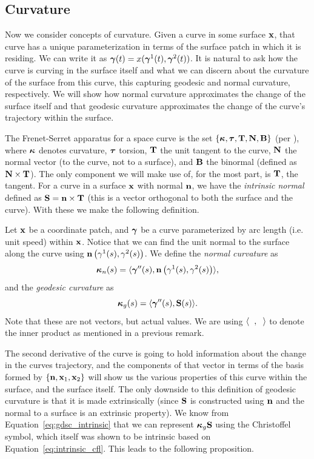 \subsection{Curvature}
  Now we consider concepts of curvature. Given a curve in some surface $\mathbf{x}$, that curve has a unique parameterization in terms of the surface patch in which it is residing. We can write it as $\boldsymbol{\gamma}(t) = x(\boldsymbol{\gamma}^1(t), \boldsymbol{\gamma}^2(t))$. It is natural to ask how the curve is curving in the surface itself and what we can discern about the curvature of the surface from this curve, this capturing geodesic and normal curvature, respectively. We will show how normal curvature approximates the change of the surface itself and that geodesic curvature approximates the change of the curve's trajectory within the surface.

  The Frenet-Serret apparatus for a space curve is the set $\{\boldsymbol{\kappa}, \boldsymbol{\tau}, \mathbf{T}, \mathbf{N}, \mathbf{B}\}$ (per \cite{MP77}), where $\boldsymbol{\kappa}$ denotes curvature, $\boldsymbol{\tau}$ torsion, $\mathbf{T}$ the unit tangent to the curve, $\mathbf{N}$ the normal vector (to the curve, not to a surface), and $\mathbf{B}$ the binormal (defined as $\mathbf{N} \times \mathbf{T}$). The only component we will make use of, for the most part, is $\mathbf{T}$, the tangent. For a curve in a surface $\mathbf{x}$ with normal $\mathbf{n}$, we have the \emph{intrinsic normal} defined as $\mathbf{S} = \mathbf{n} \times \mathbf{T}$ (this is a vector orthogonal to both the surface and the curve). With these we make the following definition.

  \begin{defn} %
    \label{def:curvature}
    Let $\mathbf{x}$ be a coordinate patch, and $\boldsymbol{\gamma}$ be a curve parameterized by arc length (i.e. unit speed) within $\mathbf{x}$. Notice that we can find the unit normal to the surface along the curve using $\mathbf{n}\left(\gamma^1(s), \gamma^2(s)\right)$. We define the \emph{normal curvature} as
    \[
      \boldsymbol{\kappa}_n(s) = \langle\boldsymbol{\gamma}^{\prime\prime}(s), \mathbf{n}\left(\gamma^1(s), \gamma^2(s)\right)\rangle,
    \]
    and the \emph{geodesic curvature} as
    \[
      \boldsymbol{\kappa}_g(s) = \langle\boldsymbol{\gamma}^{\prime\prime}(s), \mathbf{S}(s)\rangle.
    \]
    Note that these are not vectors, but actual values. We are using $\langle\phantom{x},\phantom{x}\rangle$ to denote the inner product as mentioned in a previous remark.
  \end{defn}

  The second derivative of the curve is going to hold information about the change in the curves trajectory, and the components of that vector in terms of the basis formed by $\{\mathbf{n}, \mathbf{x}_1, \mathbf{x}_2\}$ will show us the various properties of this curve within the surface, and the surface itself. The only downside to this definition of geodesic curvature is that it is made extrinsically (since $\mathbf{S}$ is constructed using $\mathbf{n}$ and the normal to a surface is an extrinsic property). We know from Equation~\ref{eq:gdsc_intrinsic} that we can represent $\boldsymbol{\kappa}_g\mathbf{S}$ using the Christoffel symbol, which itself was shown to be intrinsic based on Equation~\ref{eq:intrinsic_cfl}. This leads to the following proposition.
  
